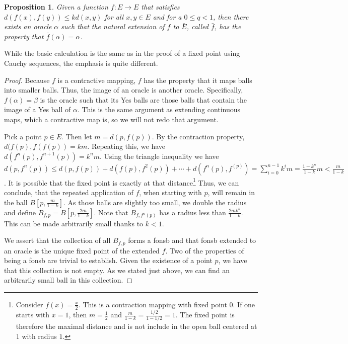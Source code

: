 \documentclass[12pt]{article}
\newtheorem{proposition}{Proposition}[section]
\begin{document}
\begin{proposition}
    Given a function $f:E \to E$ that satisfies $d(f(x), f(y)) \leq k d(x, y)$ for all $x, y \in E$ and for a $0 \leq q < 1$, then there exists an oracle $\alpha$ such that the natural extension of $f$ to $\bar{E}$, called $\bar{f}$, has the property that $\bar{f}(\alpha) = \alpha$.
\end{proposition}

While the basic calculation is the same as in the proof of a fixed point using Cauchy sequences, the emphasis is quite different. 

\begin{proof}
    Because $f$ is a contractive mapping, $f$ has the property that it maps balls into smaller balls. Thus, the image of an oracle is another oracle. Specifically, $f(\alpha) = \beta$ is the oracle such that its Yes balls are those balls that contain the image of a Yes ball of $\alpha$. This is the same argument as extending continuous maps, which a contractive map is, so we will not redo that argument. 

    Pick a point $p \in E$. Then let $m = d(p, f(p) )$. By the contraction property, $d(f(p), f(f(p)) = km$. Repeating this, we have $d(f^n(p), f^{n+1}(p) )  = k^n m$. Using the triangle inequality we have $d(p, f^n(p)) \leq d(p, f(p)) + d(f(p), f^2(p)) + \cdots + d(f^n(p), f^(p) ) = \sum_{i=0}^{n-1} k^i m = \frac{1-k^{n}}{1-k} m  < \frac{m}{1-k}$. It is possible that the fixed point is exactly at that distance\footnote{Consider $f(x) = \frac{x}{2}$. This is a contraction mapping with fixed point $0$. If one starts with $x=1$, then $m=\frac{1}{2}$ and $\frac{m}{1-k} = \frac{1/2}{1 - 1/2} = 1$. The fixed point is therefore the maximal distance and is not include in the open ball centered at $1$ with radius $1$.} Thus, we can conclude, that the repeated application of $f$, when starting with $p$, will remain in the ball $B[p, \frac{m}{1-k}]$. As those balls are slightly too small, we double the radius and define $B_{f,p} = B[p, \frac{2m}{1-k}]$. Note that $B_{f,f^n(p)}$ has a radius less than $\frac{2 m k^n}{1-k}$. This can be made arbitrarily small thanks to $k < 1$.
    
    We assert that the collection of all $B_{f,p}$ forms a fonsb and that fonsb extended to an oracle is the unique fixed point of the extended $f$. Two of the properties of being a fonsb are trivial to establish.  Given the existence of a point $p$, we have that this collection is not empty. As we stated just above, we can find an arbitrarily small ball in this collection.


\end{proof}
\end{document}
